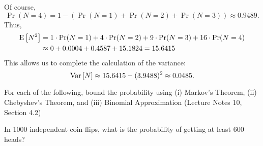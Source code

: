 \documentclass[11pt,twoside]{article}
\begin{document}
\begin{problem}
\begin{problemparts}
{Of course, 
\[
\Pr(N=4) = 1 - (\Pr(N=1) +\Pr(N=2) + \Pr(N=3)) \approx 0.9489.
\]
Thus, 
\begin{align*}
\mathop{\textup{E}}\nolimits\left[N^2\right] & = 1 \cdot \Pr(N=1) + 4 \cdot \Pr(N=2) 
                + 9 \cdot \Pr(N=3) + 16 \cdot \Pr(N=4) \\
        & \approx 0 + 0.0004 + 0.4587 + 15.1824 = 15.6415
\end{align*}
This allows us to complete the calculation of the variance:
\[
\mathop{\textup{Var}}\nolimits\left[N\right] \approx 15.6415 - (3.9488)^2 \approx 0.0485.
\]
}

\end{problemparts}

\end{problem}


\begin{problem}%

For each of the following, bound the probability using (i) Markov's Theorem,
(ii) Chebyshev's Theorem, and (iii) Binomial Approximation (Lecture Notes
10, Section 4.2)

\begin{problemparts}

\problempart
In 1000 independent coin flips, what is the probability of getting 
at least 600 heads?

\end{problemparts}
\end{problem}
\end{document}
